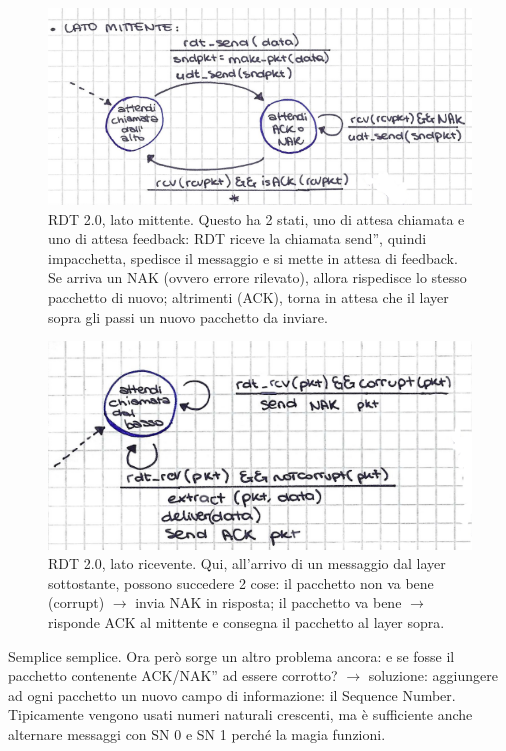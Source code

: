 \begin{figure} [h]
    \centering
    \includegraphics[width=0.75\linewidth]{Figures/03/rdt2-0-snd.png}
    \caption{RDT 2.0, lato mittente. Questo ha 2 stati, uno di attesa chiamata e uno di attesa feedback: RDT riceve la chiamata \openapex send'', quindi impacchetta, spedisce il messaggio e si mette in attesa di feedback. Se arriva un NAK (ovvero errore rilevato), allora rispedisce lo stesso pacchetto di nuovo; altrimenti (ACK), torna in attesa che il layer sopra gli passi un nuovo pacchetto da inviare.}
    \label{fig:rdt2.0s}
\end{figure}

\begin{figure} [h]
    \centering
    \includegraphics[width=0.6\linewidth]{Figures/03/rdt2-0-rcv.png}
    \caption{RDT 2.0, lato ricevente. Qui, all'arrivo di un messaggio dal layer sottostante, possono succedere 2 cose: il pacchetto non va bene (corrupt) $\rightarrow$ invia NAK in risposta; il pacchetto va bene $\rightarrow$ risponde ACK al mittente e consegna il pacchetto al layer sopra.}
    \label{fig:rdt2.0r}
\end{figure}
\newpage
\noindent Semplice semplice. Ora però sorge un altro problema ancora: e se fosse il pacchetto contenente \openapex ACK/NAK'' ad essere corrotto? $\rightarrow$ soluzione: aggiungere ad ogni pacchetto un nuovo campo di informazione: il Sequence Number. Tipicamente vengono usati numeri naturali crescenti, ma è sufficiente anche alternare messaggi con SN 0 e SN 1 perché la magia funzioni.


\bigskip
{}
